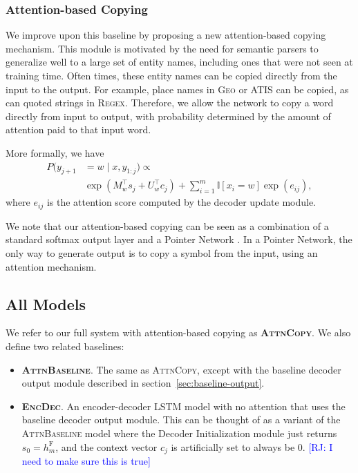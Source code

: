 \documentclass[11pt,letterpaper]{article}
\newcommand{\encdec}{\textsc{EncDec}\xspace}
\newcommand{\attn}{\textsc{AttnBaseline}\xspace}
\newcommand{\attncopy}{\textsc{AttnCopy}\xspace}
\newcommand{\atis}{\textsc{ATIS}\xspace}
\newcommand{\regex}{\textsc{Regex}\xspace}
\newcommand{\geo}{\textsc{Geo}\xspace}
\newcommand\rj[1]{\textcolor{blue}{[RJ: #1]}}
\begin{document}
\subsubsection{Attention-based Copying}
We improve upon this baseline by proposing a new 
attention-based copying mechanism.
This module is motivated by the need for semantic parsers
to generalize well to a large set of entity names,
including ones that were not seen at training time.
Often times, these entity names
can be copied directly from the input to the output.
For example, place names in \geo or \atis can be copied,
as can quoted strings in \regex.
Therefore, we allow the network to copy a word directly from input to output,
with probability determined by the amount of attention paid to that input word.

More formally, we have
\begin{align}
  P(y_{j+1} &= w \mid x, y_{1:j}) \propto 
  \\ & \exp(M_{w}^\top s_j + U_w^\top c_j)
  + \sum_{i=1}^m \mathbb{I}[x_i = w] \exp(e_{ij}),
\end{align}
where $e_{ij}$ is the attention score computed by the decoder update module.

We note that our attention-based copying can be seen as a 
combination of a standard softmax output layer
and a Pointer Network \cite{vinyals2015pointer}.  In a Pointer Network,
the only way to generate output is to copy a symbol from the input,
using an attention mechanism.

\subsection{All Models}
We refer to our full system with attention-based copying as \textbf{\attncopy}.
We also define two related baselines:
\begin{itemize}
  \item \textbf{\attn}.  The same as \attncopy, except with the baseline decoder
    output module described in section~\ref{sec:baseline-output}.
  \item \textbf{\encdec}.  An encoder-decoder LSTM model with no attention
    that uses the baseline decoder output module.  
    This can be thought of as a variant of the \attn model
    where the Decoder Initialization module
    just returns $s_0 = h_m^{\text{F}}$,
    and the context vector $c_j$ is artificially set to always be $0$.
    \rj{I need to make sure this is true}
\end{itemize}
\end{document}
